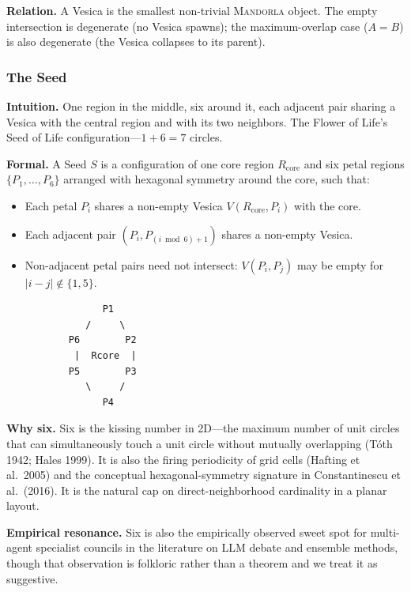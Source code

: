 \documentclass[11pt,a4paper]{article}
\begin{document}
\textbf{Relation.} A Vesica is the smallest non-trivial \textsc{Mandorla} object. The empty intersection is degenerate (no Vesica spawns); the maximum-overlap case ($A = B$) is also degenerate (the Vesica collapses to its parent).

\subsubsection*{The Seed}

\textbf{Intuition.} One region in the middle, six around it, each adjacent pair sharing a Vesica with the central region and with its two neighbors. The Flower of Life's Seed of Life configuration---$1 + 6 = 7$ circles.

\textbf{Formal.} A Seed $S$ is a configuration of one core region $R_{\text{core}}$ and six petal regions $\{P_1, \ldots, P_6\}$ arranged with hexagonal symmetry around the core, such that:

\begin{itemize}[leftmargin=*]
  \item Each petal $P_i$ shares a non-empty Vesica $V(R_{\text{core}}, P_i)$ with the core.
  \item Each adjacent pair $(P_i, P_{(i \bmod 6) + 1})$ shares a non-empty Vesica.
  \item Non-adjacent petal pairs need not intersect: $V(P_i, P_j)$ may be empty for $|i-j| \notin \{1, 5\}$.
\end{itemize}

\begin{verbatim}
                 P1
              /     \
           P6        P2
            |  Rcore  |
           P5        P3
              \     /
                 P4
\end{verbatim}

\textbf{Why six.} Six is the kissing number in 2D---the maximum number of unit circles that can simultaneously touch a unit circle without mutually overlapping (T\'oth 1942; Hales 1999). It is also the firing periodicity of grid cells (Hafting et al.\ 2005) and the conceptual hexagonal-symmetry signature in Constantinescu et al.\ (2016). It is the natural cap on direct-neighborhood cardinality in a planar layout.

\textbf{Empirical resonance.} Six is also the empirically observed sweet spot for multi-agent specialist councils in the literature on LLM debate and ensemble methods, though that observation is folkloric rather than a theorem and we treat it as suggestive.
\end{document}

